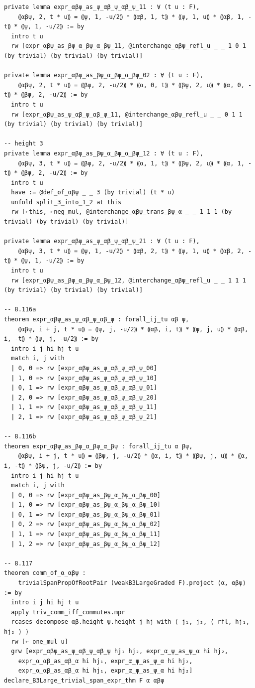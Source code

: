 \begin{Verbatim}
private lemma expr_αβψ_as_ψ_αβ_ψ_αβ_ψ_11 : ∀ (t u : F),
    ⸨αβψ, 2, t * u⸩ = ⸨ψ, 1, -u/2⸩ * ⸨αβ, 1, t⸩ * ⸨ψ, 1, u⸩ * ⸨αβ, 1, -t⸩ * ⸨ψ, 1, -u/2⸩ := by
  intro t u
  rw [expr_αβψ_as_βψ_α_βψ_α_βψ_11, @interchange_αβψ_refl_u _ _ 1 0 1 (by trivial) (by trivial) (by trivial)]

private lemma expr_αβψ_as_βψ_α_βψ_α_βψ_02 : ∀ (t u : F),
    ⸨αβψ, 2, t * u⸩ = ⸨βψ, 2, -u/2⸩ * ⸨α, 0, t⸩ * ⸨βψ, 2, u⸩ * ⸨α, 0, -t⸩ * ⸨βψ, 2, -u/2⸩ := by
  intro t u
  rw [expr_αβψ_as_ψ_αβ_ψ_αβ_ψ_11, @interchange_αβψ_refl_u _ _ 0 1 1 (by trivial) (by trivial) (by trivial)]

-- height 3
private lemma expr_αβψ_as_βψ_α_βψ_α_βψ_12 : ∀ (t u : F),
    ⸨αβψ, 3, t * u⸩ = ⸨βψ, 2, -u/2⸩ * ⸨α, 1, t⸩ * ⸨βψ, 2, u⸩ * ⸨α, 1, -t⸩ * ⸨βψ, 2, -u/2⸩ := by
  intro t u
  have := @def_of_αβψ _ _ 3 (by trivial) (t * u)
  unfold split_3_into_1_2 at this
  rw [←this, ←neg_mul, @interchange_αβψ_trans_βψ_α _ _ 1 1 1 (by trivial) (by trivial) (by trivial)]

private lemma expr_αβψ_as_ψ_αβ_ψ_αβ_ψ_21 : ∀ (t u : F),
    ⸨αβψ, 3, t * u⸩ = ⸨ψ, 1, -u/2⸩ * ⸨αβ, 2, t⸩ * ⸨ψ, 1, u⸩ * ⸨αβ, 2, -t⸩ * ⸨ψ, 1, -u/2⸩ := by
  intro t u
  rw [expr_αβψ_as_βψ_α_βψ_α_βψ_12, @interchange_αβψ_refl_u _ _ 1 1 1 (by trivial) (by trivial) (by trivial)]

-- 8.116a
theorem expr_αβψ_as_ψ_αβ_ψ_αβ_ψ : forall_ij_tu αβ ψ,
    ⸨αβψ, i + j, t * u⸩ = ⸨ψ, j, -u/2⸩ * ⸨αβ, i, t⸩ * ⸨ψ, j, u⸩ * ⸨αβ, i, -t⸩ * ⸨ψ, j, -u/2⸩ := by
  intro i j hi hj t u
  match i, j with
  | 0, 0 => rw [expr_αβψ_as_ψ_αβ_ψ_αβ_ψ_00]
  | 1, 0 => rw [expr_αβψ_as_ψ_αβ_ψ_αβ_ψ_10]
  | 0, 1 => rw [expr_αβψ_as_ψ_αβ_ψ_αβ_ψ_01]
  | 2, 0 => rw [expr_αβψ_as_ψ_αβ_ψ_αβ_ψ_20]
  | 1, 1 => rw [expr_αβψ_as_ψ_αβ_ψ_αβ_ψ_11]
  | 2, 1 => rw [expr_αβψ_as_ψ_αβ_ψ_αβ_ψ_21]

-- 8.116b
theorem expr_αβψ_as_βψ_α_βψ_α_βψ : forall_ij_tu α βψ,
    ⸨αβψ, i + j, t * u⸩ = ⸨βψ, j, -u/2⸩ * ⸨α, i, t⸩ * ⸨βψ, j, u⸩ * ⸨α, i, -t⸩ * ⸨βψ, j, -u/2⸩ := by
  intro i j hi hj t u
  match i, j with
  | 0, 0 => rw [expr_αβψ_as_βψ_α_βψ_α_βψ_00]
  | 1, 0 => rw [expr_αβψ_as_βψ_α_βψ_α_βψ_10]
  | 0, 1 => rw [expr_αβψ_as_βψ_α_βψ_α_βψ_01]
  | 0, 2 => rw [expr_αβψ_as_βψ_α_βψ_α_βψ_02]
  | 1, 1 => rw [expr_αβψ_as_βψ_α_βψ_α_βψ_11]
  | 1, 2 => rw [expr_αβψ_as_βψ_α_βψ_α_βψ_12]

-- 8.117
theorem comm_of_α_αβψ :
    trivialSpanPropOfRootPair (weakB3LargeGraded F).project ⟨α, αβψ⟩ := by
  intro i j hi hj t u
  apply triv_comm_iff_commutes.mpr
  rcases decompose αβ.height ψ.height j hj with ⟨ j₁, j₂, ⟨ rfl, hj₁, hj₂ ⟩ ⟩
  rw [← one_mul u]
  grw [expr_αβψ_as_ψ_αβ_ψ_αβ_ψ hj₁ hj₂, expr_α_ψ_as_ψ_α hi hj₂,
    expr_α_αβ_as_αβ_α hi hj₁, expr_α_ψ_as_ψ_α hi hj₂,
    expr_α_αβ_as_αβ_α hi hj₁, expr_α_ψ_as_ψ_α hi hj₂]
declare_B3Large_trivial_span_expr_thm F α αβψ


\end{Verbatim}
